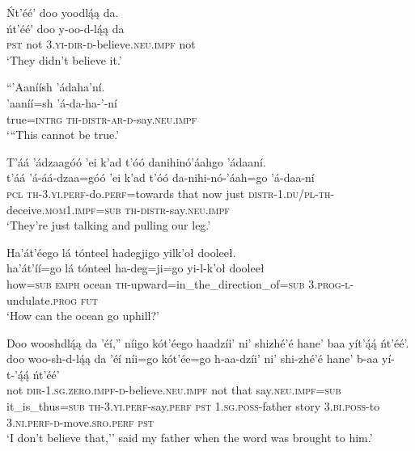 \ea\label{ex:text6-11-22}
Ńt’éé’ doo yoodlą́ą da.\\
\gll ńt’éé’	doo	y-oo-d-lą́ą	da\\
     \textsc{pst}	not	3.\textsc{yi}-\textsc{dir}-\textsc{d}-believe.\textsc{neu}.\textsc{impf}	not\\
\glt `They didn't believe it.'
\z

\ea\label{ex:text6-11-23}
``’Aaníísh ’ádaha’ní.\\
\gll ’aaníí=sh	’á-da-ha-’-ní\\
     true=\textsc{intrg}	\textsc{th}-\textsc{distr}-\textsc{ar}-\textsc{d}-say.\textsc{neu}.\textsc{impf}\\
\glt `“This cannot be true.'
\z

\ea\label{ex:text6-11-24}
T’áá ’ádzaagóó ’ei k’ad t’óó danihinó’áahgo ’ádaaní.\\
\gll t’áá ’á-áá-dzaa=góó	’ei	k’ad	t’óó	da-nihi-nó-’áah=go	’á-daa-ní\\
     \textsc{pcl} \textsc{th}-3.\textsc{yi}.\textsc{perf}-do.\textsc{perf}=towards	that	now	just	\textsc{distr}-1.\textsc{du}/\textsc{pl}-\textsc{th}-deceive.\textsc{mom}1.\textsc{impf}=\textsc{sub}	\textsc{th}-\textsc{distr}-say.\textsc{neu}.\textsc{impf}\\
\glt `They're just talking and pulling our leg.'
\z

\ea\label{ex:text6-11-25}
Ha’át’éego lá tónteel hadegjigo yilk’oł dooleeł.\\
\gll ha’át’íí=go	lá	tónteel	ha-deg=ji=go	yi-l-k’oł	dooleeł\\
     how=\textsc{sub}	\textsc{emph}	ocean	\textsc{th}-upward=in\_the\_direction\_of=\textsc{sub}	3.\textsc{prog}-\textsc{l}-undulate.\textsc{prog}	\textsc{fut}\\
\glt `How can the ocean go uphill?'
\z

\ea\label{ex:text6-11-26}
Doo wooshdlą́ą da ’éí,'' níigo kót’éego haadzíi’ ni’ shizhé’é hane’ baa yít’ą́ą́ ńt’éé’.\\
\gll doo	woo-sh-d-lą́ą	da	’éí	níi=go	kót’ée=go	h-aa-dzíi’	ni’	shi-zhé’é	hane’	b-aa	yí-t-’ą́ą́	ńt’éé’\\
     not	\textsc{dir}-1.\textsc{sg}.\textsc{zero}.\textsc{impf}-\textsc{d}-believe.\textsc{neu}.\textsc{impf}	not	that	say.\textsc{neu}.\textsc{impf}=\textsc{sub}	it\_is\_thus=\textsc{sub}	\textsc{th}-3.\textsc{yi}.\textsc{perf}-say.\textsc{perf}	\textsc{pst}	1.\textsc{sg}.\textsc{poss}-father	story	3.\textsc{bi}.\textsc{poss}-to	3.\textsc{ni}.\textsc{perf}-\textsc{d}-move.\textsc{sro}.\textsc{perf}	\textsc{pst}\\
\glt `I don't believe that,'' said my father when the word was brought to him.'
\z


